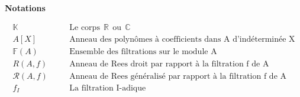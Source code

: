 \newpage

\begin{center}
	\LARGE{\textbf{Notations}}
\end{center}


\begin{eqnarray*}
	\mathbb{K} & & \quad \text{Le  corps} \ \ \mathbb{R} \ \ \text{ou} \ \ \mathbb{C}\\
	A[X] & & \quad \text{Anneau des polynômes à coefficients dans A d'indéterminée X}\\
	\mathbb{F}(A) & & \quad \text{Ensemble des filtrations sur le module A}\\
	R(A,f) & & \quad \text{Anneau de Rees droit par rapport à la filtration f de A}\\
	\mathcal{R}(A,f) & & \quad \text{Anneau de Rees généralisé par rapport à la filtration f de A}\\
	f_{I} & & \quad \text{La filtration I-adique}
\end{eqnarray*}